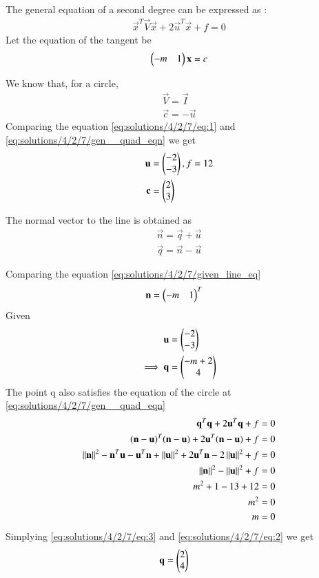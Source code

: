 
The general equation of a second degree can be expressed as :
\begin{align}
	\vec{x}^T\vec{V}\vec{x}+2\vec{u}^T\vec{x}+f=0\label{eq:solutions/4/2/7/gen__quad_eqn}
\end{align}
Let the equation of the tangent be
\begin{align}
	\begin{pmatrix}-m & 1\end{pmatrix}\mathbf{x}=c \label{eq:solutions/4/2/7/given_line_eq}
\end{align}

We know that, for a circle, 
\begin{align}
	\vec{V} = \vec{I}  \\
	\vec{c} = -\vec{u}
\end{align}
Comparing the equation \eqref{eq:solutions/4/2/7/eq:1} and \eqref{eq:solutions/4/2/7/gen__quad_eqn}
we get
\begin{align}
	\mathbf{u}&=\begin{pmatrix}-2 \\ -3\end{pmatrix}, f=12 \\
	\mathbf{c}&=\begin{pmatrix}2 \\ 3\end{pmatrix}
\end{align} 

The normal vector to the line is obtained as 
\begin{align}
	\vec{n} = \vec{q} + \vec{u} \label{eq:solutions/4/2/7/eq1}\\
	\vec{q} = \vec{n} - \vec{u}
\end{align}

Comparing the equation \eqref{eq:solutions/4/2/7/given_line_eq} 
\begin{align}
	\mathbf{n} &= \begin{pmatrix}-m &1\end{pmatrix}^T
\end{align}
Given
\begin{align}
	 \mathbf{u}&=\begin{pmatrix}-2 \\ -3\end{pmatrix}\\
\implies	 \mathbf{q} &= \begin{pmatrix}-m+2 \\ 4\end{pmatrix}\label{eq:solutions/4/2/7/eq:2}
\end{align}
The point q also satisﬁes the equation of the circle at \eqref{eq:solutions/4/2/7/gen__quad_eqn}
\begin{align}
	\mathbf{q}^T\mathbf{q}+2\mathbf{u}^T\mathbf{q}+f=0\\
	(\mathbf{n} -\mathbf{u})^T(\mathbf{n} -\mathbf{u})+2\mathbf{u}^T(\mathbf{n} -\mathbf{u}) +f =0\\
	\left\lVert\mathbf{n}\right\rVert^2 - \mathbf{n}^T\mathbf{u}-\mathbf{u}^T\mathbf{n}+\left\lVert\mathbf{u}\right\rVert^2+2\mathbf{u}^T\mathbf{n}- 2\left\lVert\mathbf{u}\right\rVert^2+f=0\\
	\left\lVert\mathbf{n}\right\rVert^2 -\left\lVert\mathbf{u}\right\rVert^2+f=0\\
	m^2+1-13+12=0\\
	m^2=0\\
	m=0\label{eq:solutions/4/2/7/eq:3}
\end{align}
Simplying \eqref{eq:solutions/4/2/7/eq:3} and \eqref{eq:solutions/4/2/7/eq:2} we get
\begin{align}
	\mathbf{q} &= \begin{pmatrix}2 \\ 4\end{pmatrix}
\end{align}

